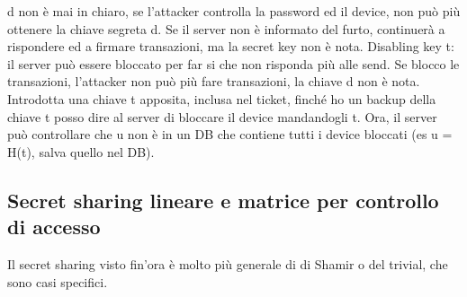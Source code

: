 \documentclass[16px]{article}
\begin{document}
d non è mai in chiaro, se l'attacker controlla la password ed il device, non può più ottenere la chiave segreta d. Se il server non è informato del furto, continuerà a rispondere ed a firmare transazioni, ma la secret key non è nota. Disabling key t: il server può essere bloccato per far si che non risponda più alle send. Se blocco le transazioni, l'attacker non può più fare transazioni, la chiave d non è nota. Introdotta una chiave t apposita, inclusa nel ticket, finché ho un backup della chiave t posso dire al server di bloccare il device mandandogli t. Ora, il server può controllare che u non è in un DB che contiene tutti i device bloccati (es u = H(t), salva quello nel DB).
\subsection{Secret sharing lineare e matrice per controllo di accesso}
Il secret sharing visto fin'ora è molto più generale di di Shamir o del trivial, che sono casi specifici.
\end{document}
